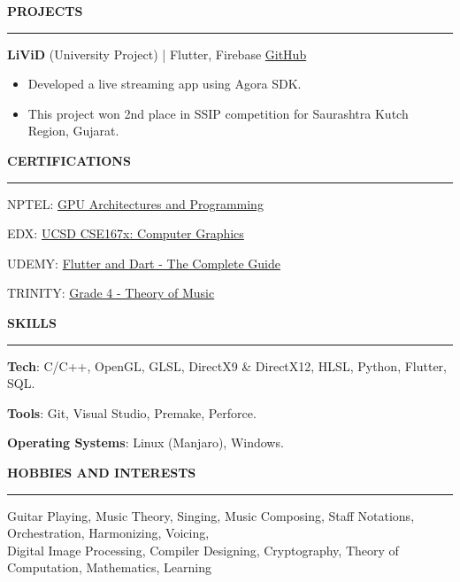 \documentclass[a4paper, 11pt]{article}
\newenvironment{resumeSection}[1]
{
    \MakeUppercase{\Large\textbf{#1}}
    \medskip
    \hrule
    \begin{list}{}
    {
        \setlength\itemsep{-0.3em}
        \setlength\leftmargin{0em}
    }
    \vspace{-1em}
    \item[]
}
{   \end{list}  }
\newenvironment{sectionItems}
{
    \vspace{-0.5em}
    \begin{itemize}
    \setlength{\itemsep}{-0.7em}
}
{
    \end{itemize}
}
\begin{document}
\begin{resumeSection}{Projects}
    \item \textbf{LiViD} (University Project) | {Flutter, Firebase}
    \hfill \href{https://github.com/JayNakum/LiViD}{GitHub}
    \begin{sectionItems}
        \setlength\itemsep{-0.5em}
        \item Developed a live streaming app using Agora SDK.
        \item This project won 2nd place in SSIP competition for Saurashtra Kutch Region, Gujarat.
    \end{sectionItems}

\end{resumeSection}

\medskip
\begin{multicols}{2}
\begin{resumeSection}{Certifications}
    \item NPTEL: \href{https://drive.google.com/file/d/1Lztoogwv_jMQIze_FJ7pvFZbglfMw4s2/view?usp=sharing}{GPU Architectures and Programming}
    \item EDX: \href{https://courses.edx.org/certificates/3e47add62a6b45269149bf91b91f1399}{UCSD CSE167x: Computer Graphics}
    \item UDEMY: \href{https://www.udemy.com/certificate/UC-2fce7723-1cc7-403d-a54b-09dbd5cd495e/}{Flutter and Dart - The Complete Guide}
    \item TRINITY: \href{https://drive.google.com/file/d/1S-b58wIceYXIlX24bubJy8Z2aT2lQV2d/view?usp=sharing}{Grade 4 - Theory of Music}
\end{resumeSection}
\columnbreak
\begin{resumeSection}{Skills}
    \item \textbf{Tech}: C/C++, OpenGL, GLSL, DirectX9 \& DirectX12, HLSL, Python, Flutter, SQL.
    \item \textbf{Tools}: Git, Visual Studio, Premake, Perforce.
    \item \textbf{Operating Systems}: Linux (Manjaro), Windows.
\end{resumeSection}
\end{multicols}
\begin{resumeSection}{Hobbies and Interests}
    \item Guitar Playing, Music Theory, Singing, Music Composing, Staff Notations, Orchestration, Harmonizing, Voicing, 
    \\
    Digital Image Processing, Compiler Designing, Cryptography, Theory of Computation, Mathematics, Learning
\end{resumeSection}
\end{document}
